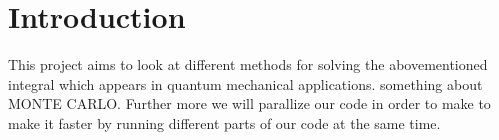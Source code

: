 \documentclass[../main.tex]{subfiles}
\begin{document}
\section{Introduction} \label{sec:intro}
This project aims to look at different methods for solving the abovementioned integral which appears in quantum mechanical applications.
something about MONTE CARLO. 
Further more we will parallize our code in order to make to make it faster by running different parts of our code at the same time.
\end{document}
